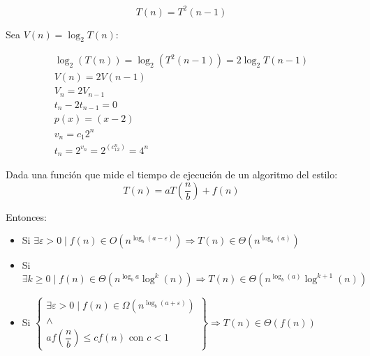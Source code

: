 \begin{ejemplo}
\begin{equation*}
    T(n) = T^2(n-1)
\end{equation*}

Sea $V(n) = \log_2 T(n)$:

\begin{gather*}
    \log_2(T(n)) = \log_2\left(T^2 (n-1)\right) = 2\log_2 T(n-1)\\
    V(n) = 2V(n-1)\\
    V_n = 2V_{n-1}\\
    t_n - 2t_{n-1} = 0\\
    p(x) = (x-2)\\
    v_n = c_1 2^n\\
    t_n = 2^{v_n} = 2^{(c_12^n)} = 4^n
\end{gather*}
\end{ejemplo}

\begin{teo}
    Dada una función que mide el tiempo de ejecución de un algoritmo del estilo:
\begin{equation*}
    T(n) = aT\left(\dfrac{n}{b}\right) + f(n)
\end{equation*}

Entonces:
\begin{itemize}
    \item Si $\exists \varepsilon > 0 \mid f(n) \in O\left(n^{\log_b(a-\varepsilon)}\right) \Rightarrow T(n)  \in \Theta\left(n^{\log_b(a)}\right)$
    \item Si $\exists k\geq 0 \mid f(n) \in \Theta\left(n^{\log_b a} \log^k(n)\right) \Rightarrow T(n)  \in \Theta\left(n^{\log_b(a)}\log^{k+1}(n)\right)$
    \item Si $\displaystyle\left\{ \begin{array}{c}
               \exists \varepsilon > 0 \mid f(n) \in \Omega\left(n^{\log_b(a+\varepsilon)}\right) \\ \land\\
               af\left(\dfrac{n}{b}\right) \leq cf(n) \text{\ con\ } c<1
       \end{array}\right\} \Rightarrow T(n)  \in \Theta(f(n))$
\end{itemize}
\end{teo}

